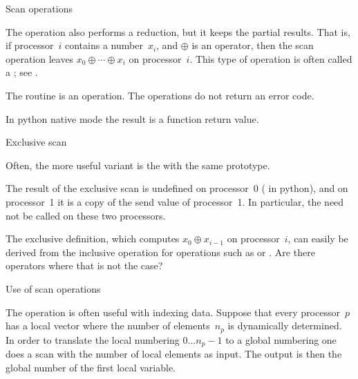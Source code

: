 
 {Scan operations}

\label{sec:scan}

The  operation also performs a reduction, but it keeps 
the partial results. That is, if processor~$i$ contains a number~$x_i$, 
and $\oplus$ is an operator,
then the scan operation leaves $x_0\oplus\cdots\oplus x_i$ on processor~$i$.
This type of operation is often called a ;
see .

The  routine is an  operation.
The  operations do not return an error code.

In python native mode the result is a function return value.
%

 {Exclusive scan}

Often, the more useful variant is the 
%
%
with the same prototype. 

The result of the exclusive scan is undefined on processor~0
( in python),
and on processor~1 it is a copy of the send value of processor~1.
In particular, the  need not be called on these two 
processors.

\begin{exercise}
  The exclusive definition, which computes $x_0\oplus x_{i-1}$ on
  processor~$i$, can easily be derived from the inclusive operation
  for operations such as  or
  .  Are there operators where that is not the
  case?
\end{exercise}

 {Use of scan operations}

The  operation is often useful with indexing data. Suppose that
every processor~$p$ has a local vector where the number of elements~$n_p$ is dynamically 
determined. In order to translate the local numbering $0\ldots n_p-1$ to a global numbering
one does a scan with the number of local elements as input. The output is then the global 
number of the first local variable.


